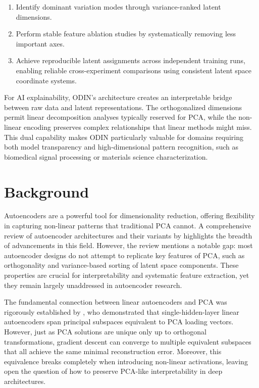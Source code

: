\documentclass[twoside,11pt]{article}
\begin{document}
\begin{enumerate}
    \item Identify dominant variation modes through variance-ranked latent dimensions.
    \item Perform stable feature ablation studies by systematically removing less important axes.
    \item Achieve reproducible latent assignments across independent training runs, enabling reliable cross-experiment comparisons using consistent latent space coordinate systems.
\end{enumerate}


For AI explainability, ODIN's architecture creates an interpretable bridge between raw data and latent representations. The orthogonalized dimensions permit linear decomposition analyses typically reserved for PCA, while the non-linear encoding preserves complex relationships that linear methods might miss. This dual capability makes ODIN particularly valuable for domains requiring both model transparency and high-dimensional pattern recognition, such as biomedical signal processing or materials science characterization.

\section{Background}
Autoencoders are a  powerful tool for dimensionality reduction, offering flexibility in capturing non-linear patterns that traditional PCA cannot. A comprehensive review of autoencoder architectures and their variants by \cite{li2023comprehensive} highlights the breadth of advancements in this field. However, the review mentions a notable gap: most autoencoder designs do not attempt to replicate key features of PCA, such as orthogonality and variance-based sorting of latent space components. These properties are crucial for interpretability and systematic feature extraction, yet they remain largely unaddressed in autoencoder research.

The fundamental connection between linear autoencoders and PCA was rigorously established by \cite{plaut2018principal}, who demonstrated that single-hidden-layer linear autoencoders span principal subspaces equivalent to PCA loading vectors. However, just as PCA solutions are unique only up to orthogonal transformations, gradient descent can converge to multiple equivalent subspaces that all achieve the same minimal reconstruction error. Moreover, this equivalence breaks completely when introducing non-linear activations, leaving open the question of how to preserve PCA-like interpretability in deep architectures.
\end{document}
